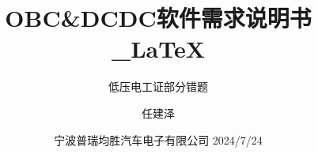 \subtitle{低压电工证部分错题}
\title{OBC\&DCDC软件需求说明书\_\LaTeX }
\author{任建泽}
\date{宁波普瑞均胜汽车电子有限公司 2024/7/24}
\makecover
\clearpage
{} %
\setcounter{page}{1} %
\tableofcontents
\clearpage
{} %
\setcounter{page}{1} %

\setlength{\parindent}{2em}   %







